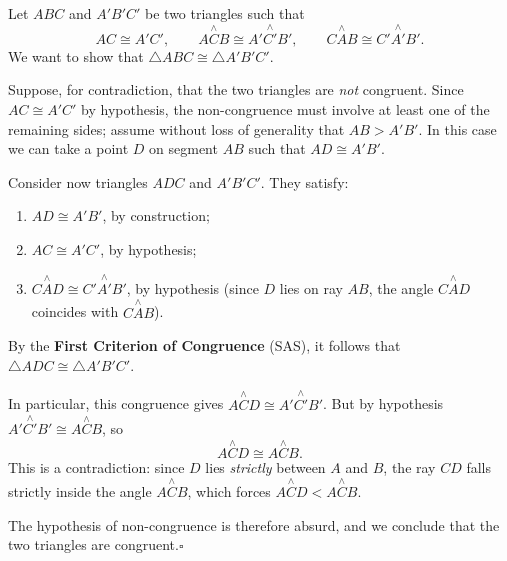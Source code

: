 \documentclass[12pt, a4paper]{article}
\newcommand{\ang}[1]{\overset{\wedge}{#1}}
\theoremstyle{criterion}
\begin{document}
\noindent
Let $ABC$ and $A'B'C'$ be two triangles such that
\[
  AC \cong A'C', \qquad A\ang{C}B \cong A'\ang{C'}B', \qquad
  C\ang{A}B \cong C'\ang{A'}B'.
\]
We want to show that $\triangle ABC \cong \triangle A'B'C'$.

\begin{center}
\end{center}

\noindent
Suppose, for contradiction, that the two triangles are \emph{not}
congruent. Since $AC \cong A'C'$ by hypothesis, the non-congruence must
involve at least one of the remaining sides; assume without loss of
generality that $AB > A'B'$. In this case we can take a point $D$ on
segment $AB$ such that $AD \cong A'B'$.

\medskip\noindent
Consider now triangles $ADC$ and $A'B'C'$. They satisfy:
\begin{enumerate}
  \item $AD \cong A'B'$, by construction;
  \item $AC \cong A'C'$, by hypothesis;
  \item $C\ang{A}D \cong C'\ang{A'}B'$, by hypothesis (since $D$ lies on
        ray $AB$, the angle $C\ang{A}D$ coincides with $C\ang{A}B$).
\end{enumerate}
By the \textbf{First Criterion of Congruence} (SAS), it follows that
$\triangle ADC \cong \triangle A'B'C'$.

\medskip\noindent
In particular, this congruence gives $A\ang{C}D \cong A'\ang{C'}B'$.
But by hypothesis $A'\ang{C'}B' \cong A\ang{C}B$, so
\[
    A\ang{C}D \cong A\ang{C}B.
\]
This is a contradiction: since $D$ lies \emph{strictly} between $A$ and
$B$, the ray $CD$ falls strictly inside the angle $A\ang{C}B$, which
forces $A\ang{C}D < A\ang{C}B$.

\medskip\noindent
The hypothesis of non-congruence is therefore absurd, and we conclude that
the two triangles are congruent.\hfill$\square$
\end{document}
